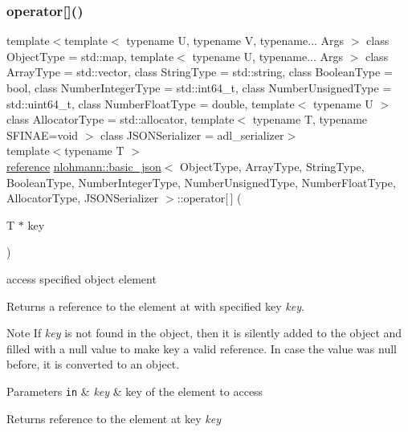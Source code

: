 \subsubsection{\texorpdfstring{operator[]()}{operator[]()}\hspace{0.1cm}{\footnotesize\ttfamily [5/8]}}
{\footnotesize\ttfamily template$<$template$<$ typename U, typename V, typename... Args $>$ class Object\+Type = std\+::map, template$<$ typename U, typename... Args $>$ class Array\+Type = std\+::vector, class String\+Type  = std\+::string, class Boolean\+Type  = bool, class Number\+Integer\+Type  = std\+::int64\+\_\+t, class Number\+Unsigned\+Type  = std\+::uint64\+\_\+t, class Number\+Float\+Type  = double, template$<$ typename U $>$ class Allocator\+Type = std\+::allocator, template$<$ typename T, typename S\+F\+I\+N\+A\+E=void $>$ class J\+S\+O\+N\+Serializer = adl\+\_\+serializer$>$ \\
template$<$typename T $>$ \\
\mbox{\hyperlink{classnlohmann_1_1basic__json_ac6a5eddd156c776ac75ff54cfe54a5bc}{reference}} \mbox{\hyperlink{classnlohmann_1_1basic__json}{nlohmann\+::basic\+\_\+json}}$<$ Object\+Type, Array\+Type, String\+Type, Boolean\+Type, Number\+Integer\+Type, Number\+Unsigned\+Type, Number\+Float\+Type, Allocator\+Type, J\+S\+O\+N\+Serializer $>$\+::operator\mbox{[}$\,$\mbox{]} (\begin{DoxyParamCaption}\item[{T $\ast$}]{key }\end{DoxyParamCaption})\hspace{0.3cm}{\ttfamily [inline]}}



access specified object element 

Returns a reference to the element at with specified key {\itshape key}.

\begin{DoxyNote}{Note}
If {\itshape key} is not found in the object, then it is silently added to the object and filled with a {\ttfamily null} value to make {\ttfamily key} a valid reference. In case the value was {\ttfamily null} before, it is converted to an object.
\end{DoxyNote}

\begin{DoxyParams}[1]{Parameters}
\mbox{\tt in}  & {\em key} & key of the element to access\\
\hline
\end{DoxyParams}
\begin{DoxyReturn}{Returns}
reference to the element at key {\itshape key} 
\end{DoxyReturn}

